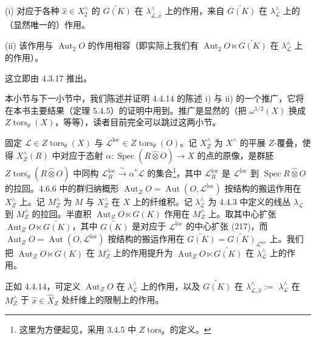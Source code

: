 
(i) 对应于各种 $\hat x\in X_{2}^{\wedge}$ 的 $\widetilde{G(K)}$ 在 $\lambda_{\mathcal{L},\hat x}^{\wedge}$ 上的作用，来自 $\widetilde{G(K)}$ 在 $\lambda_{\mathcal{L}}^{\wedge}$ 上的（显然唯一的）作用。

(ii) 该作用与 $\operatorname{Aut}_{2}O$ 的作用相容（即实际上我们有 $\operatorname{Aut}_{2}O\ltimes\widetilde{G(K)}$ 在 $\lambda_{\mathcal{L}}^{\wedge}$ 上的作用）。

这立即由 4.3.17 推出。

 本小节与下一小节中，我们陈述并证明 4.4.14 的陈述 i) 与 ii) 的一个推广，它将在本书主要结果（定理 5.4.5）的证明中用到。推广是显然的（把 $\omega^{1/2}(X)$ 换成 $Z\operatorname{tors}_{\theta}(X)$，等等），读者目前完全可以跳过这两小节。

固定 $\mathcal{L}\in Z\operatorname{tors}_{\theta}(X)$ 与 $\mathcal{L}^{\mathrm{loc}}\in Z\operatorname{tors}_{\theta}(O)$。记 $X_{Z}^{\wedge}$ 为 $X^{\wedge}$ 的平展 $Z$-覆叠，使得 $X_{Z}^{\wedge}(R)$ 中对应于态射 $\alpha:\operatorname{Spec}(R\hat\otimes O)\to X$ 的点的原像，是群胚 $Z\operatorname{tors}_{\theta}(R\hat\otimes O)$ 中同构 $\mathcal{L}_{R}^{\mathrm{loc}}\xrightarrow{\ \sim\ }\alpha^{*}\mathcal{L}$ 的集合\footnote{这里为方便起见，采用 3.4.5 中 $Z\operatorname{tors}_{\theta}$ 的定义。}，其中 $\mathcal{L}_{R}^{\mathrm{loc}}$ 是 $\mathcal{L}^{\mathrm{loc}}$ 到 $\operatorname{Spec}R\hat\otimes O$ 的拉回。4.6.6 中的群归纳概形 $\operatorname{Aut}_{Z}O=\operatorname{Aut}(O,\mathcal{L}^{\mathrm{loc}})$ 按结构的搬运作用在 $X_{Z}^{\wedge}$ 上。记 $M_{Z}^{\wedge}$ 为 $M$ 与 $X_{Z}^{\wedge}$ 在 $X$ 上的纤维积。记 $\lambda_{\mathcal{L}}^{\wedge}$ 为 4.4.3 中定义的线丛 $\lambda_{\mathcal{L}}$ 到 $M_{Z}^{\wedge}$ 的拉回。半直积 $\operatorname{Aut}_{Z}O\ltimes G(K)$ 作用在 $M_{Z}^{\wedge}$ 上。取其中心扩张 $\operatorname{Aut}_{Z}O\ltimes\widetilde{G(K)}$，其中 $\widetilde{G(K)}$ 是对应于 $\mathcal{L}^{\mathrm{loc}}$ 的中心扩张 (217)，而 $\operatorname{Aut}_{Z}O=\operatorname{Aut}(O,\mathcal{L}^{\mathrm{loc}})$ 按结构的搬运作用在 $\widetilde{G(K)}=\widetilde{G(K)}_{\mathcal{L}^{\mathrm{loc}}}$ 上。我们把 $\operatorname{Aut}_{Z}O\ltimes G(K)$ 在 $M_{Z}^{\wedge}$ 上的作用提升为 $\operatorname{Aut}_{Z}O\ltimes\widetilde{G(K)}$ 在 $\lambda_{\mathcal{L}}^{\wedge}$ 上的作用。

正如 4.4.14，可定义 $\operatorname{Aut}_{Z}O$ 在 $\lambda_{\mathcal{L}}^{\wedge}$ 上的作用，以及 $\widetilde{G(K)}$ 在 $\lambda_{\mathcal{L},\hat x}^{\wedge}:=$ $\lambda_{\mathcal{L}}^{\wedge}$ 在 $M_{Z}^{\wedge}$ 于 $\hat x\in\hat X_{Z}$ 处纤维上的限制上的作用。

